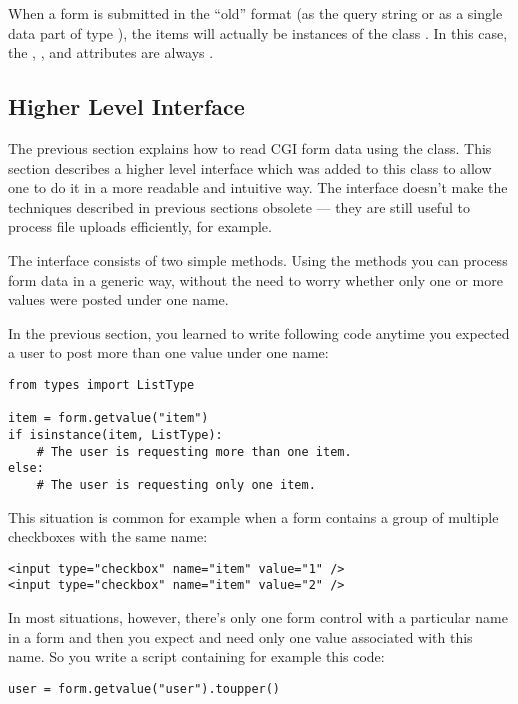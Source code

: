 When a form is submitted in the ``old'' format (as the query string or
as a single data part of type
), the items will actually
be instances of the class .  In this case, the
, , and  attributes are
always .


\subsection{Higher Level Interface}


The previous section explains how to read CGI form data using the
 class.  This section describes a higher level
interface which was added to this class to allow one to do it in a
more readable and intuitive way.  The interface doesn't make the
techniques described in previous sections obsolete --- they are still
useful to process file uploads efficiently, for example.

The interface consists of two simple methods. Using the methods
you can process form data in a generic way, without the need to worry
whether only one or more values were posted under one name.

In the previous section, you learned to write following code anytime
you expected a user to post more than one value under one name:

\begin{verbatim}
from types import ListType

item = form.getvalue("item")
if isinstance(item, ListType):
    # The user is requesting more than one item.
else:
    # The user is requesting only one item.
\end{verbatim}

This situation is common for example when a form contains a group of
multiple checkboxes with the same name:

\begin{verbatim}
<input type="checkbox" name="item" value="1" />
<input type="checkbox" name="item" value="2" />
\end{verbatim}

In most situations, however, there's only one form control with a
particular name in a form and then you expect and need only one value
associated with this name.  So you write a script containing for
example this code:

\begin{verbatim}
user = form.getvalue("user").toupper()
\end{verbatim}

